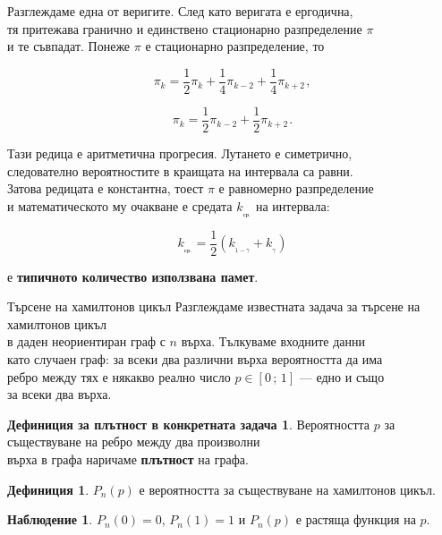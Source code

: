 \documentclass{beamer}
\theoremstyle{definition}
\newtheorem{defn}[thm]{Дефиниция}
\newtheorem{nabl}[thm]{Наблюдение}
\newtheorem{defnplt}[thm]{Дефиниция за плътност в конкретната задача}
\theoremstyle{remark}
\begin{document}
\begin{frame}
	Разглеждаме една от веригите. След като веригата е ергодична,\\
	тя притежава гранично и единствено стационарно разпределение $\pi$\\
	и те съвпадат. Понеже $\pi$ е стационарно разпределение, то

	\[\pi_{k}=\frac{1}{2}\pi_{k}+\frac{1}{4}\pi_{k-2}+\frac{1}{4}\pi_{k+2}\hspace{1pt},\]

	\[\pi_{k}=\frac{1}{2}\pi_{k-2}+\frac{1}{2}\pi_{k+2}\hspace{1pt}.\]

	Тази редица е аритметична прогресия. Лутането е симетрично,\\
	следователно вероятностите в краищата на интервала са равни.\\
	Затова редицата е константна, тоест $\pi$ е равномерно разпределение\\
	и математическото му очакване е средата $k_{_{\scriptstyle\text{ср.}}}$ на интервала:

	\[k_{_{\scriptstyle\text{ср.}}}=\frac{1}{2}\left(k_{_{\scriptstyle 1-\gamma}}+k_{_{\scriptstyle\gamma}}\right)\]

	е \textbf{типичното количество използвана памет}. 
\end{frame}
\begin{frame}{Търсене на хамилтонов цикъл}
	Разглеждаме известната задача за търсене на хамилтонов цикъл\\
	в даден неориентиран граф с $n$ върха.
	Тълкуваме входните данни\\ като случаен граф:
	за всеки два различни върха вероятността да има\\ ребро между тях
	е някакво реално число \mbox{$p\in[0\,;\,1]$} --- 
	едно и също\\ за всеки два върха.\\
	\begin{defnplt} 
		Вероятността $p$ за съществуване на ребро между два произволни\\
		върха в графа наричаме \textbf{плътност} на графа.
	\end{defnplt}
	\begin{defn} 
		$P_n(p)$ е вероятността за съществуване на хамилтонов цикъл.
	\end{defn}
	\begin{nabl} 
		\mbox{$P_n(0) = 0$,} \;\mbox{$P_n(1) = 1$}\; и\;
		$P_n(p)$ е растяща функция на $p$.
	\end{nabl}
\end{frame}
\end{document}
